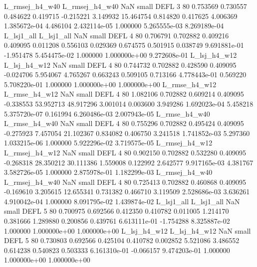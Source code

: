 L_rmsej_h4_w40 L_rmsej_h4_w40                   NaN      small     DEFL                 3 80 0.753569       0.730557 0.484622       0.419715   -0.215221      3.149932     15.464754     0.814820       0.417625  4.006369 1.385672e-04     4.486104   2.432114e-05            1.000000    5.265555e-03        8.269189e-04
    L_lsj1_all     L_lsj1_all                   NaN      small     DEFL                 4 80 0.706791       0.702882 0.409216       0.409095    0.011208      0.556103      0.029369     0.674575       0.501915  0.038749 9.691881e-01    -1.951478   5.454475e-02            1.000000    1.000000e+00        9.272608e-01
  L_lsj_h4_w12   L_lsj_h4_w12                   NaN      small     DEFL                 4 80 0.744732       0.702882 0.428590       0.409095   -0.024706      5.954067      4.765267     0.663243       0.509105  0.713166 4.778443e-01     0.569220   5.708220e-01            1.000000    1.000000e+00        1.000000e+00
 L_rmse_h4_w12  L_rmse_h4_w12                   NaN      small     DEFL                 4 80 1.082106       0.702882 0.609214       0.409095   -0.338553     53.952713     48.917296     3.001014       0.003600  3.949286 1.692023e-04     5.458218   5.375720e-07            0.161994    6.260486e-03        2.007943e-05
 L_rmse_h4_w40  L_rmse_h4_w40                   NaN      small     DEFL                 4 80 0.755296       0.702882 0.495424       0.409095   -0.275923      7.457054     21.102367     0.834082       0.406750  3.241518 1.741852e-03     5.297360   1.033215e-06            1.000000    5.922296e-02        3.719575e-05
L_rmsej_h4_w12 L_rmsej_h4_w12                   NaN      small     DEFL                 4 80 0.902150       0.702882 0.532280       0.409095   -0.268318     28.350212     30.111386     1.559008       0.122992  2.642577 9.917165e-03     4.381767   3.582726e-05            1.000000    2.875978e-01        1.182299e-03
L_rmsej_h4_w40 L_rmsej_h4_w40                   NaN      small     DEFL                 4 80 0.725413       0.702882 0.460868       0.409095   -0.169610      3.205615     12.655341     0.731382       0.466710  3.119509 2.528686e-03     3.636261   4.910042e-04            1.000000    8.091795e-02        1.439874e-02
    L_lsj1_all     L_lsj1_all                   NaN      small     DEFL                 5 80 0.700975       0.692566 0.412350       0.410782    0.011005      1.214170      0.381666     1.289880       0.200856  0.439761 6.613111e-01    -1.754288   8.325887e-02            1.000000    1.000000e+00        1.000000e+00
  L_lsj_h4_w12   L_lsj_h4_w12                   NaN      small     DEFL                 5 80 0.730803       0.692566 0.425104       0.410782    0.002852      5.521086      3.486552     0.614238       0.540823  0.503333 6.161310e-01    -0.066157   9.474203e-01            1.000000    1.000000e+00        1.000000e+00
